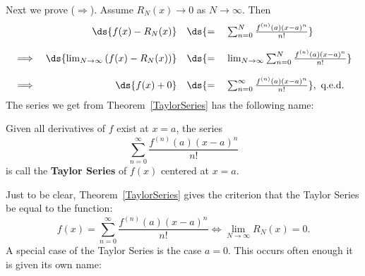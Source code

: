 Next we prove ($\Longrightarrow$).
Assume $R_N(x)\longrightarrow0$ as $N\to\infty$.
Then
$$\begin{array}{rrl}
&\ds{f(x)-R_N(x)}&\ds{=\quad\sum_{n=0}^N\frac{f^{(n)}(a)(x-a)^n}{n!}}\\
\\ \implies&\ds{\lim_{N\to\infty}\left(f(x)-R_N(x)\right)}&
	\ds{=\quad\lim_{N\to\infty}\sum_{n=0}^N\frac{f^{(n)}(a)(x-a)^n}{n!}}\\
\\ \implies&\ds{f(x)+0}&
	\ds{=\quad\sum_{n=0}^\infty\frac{f^{(n)}(a)(x-a)^n}{n!}},
\text{ q.e.d.}\end{array}  
$$
The series we get from Theorem~\ref{TaylorSeries} has the following
name:
\begin{definition}Given all derivatives of $f$ exist at $x=a$,
the series
\begin{equation} \sum_{n=0}^\infty\frac{f^{(n)}(a)(x-a)^n}{n!}
\label{TaylorSeriesDefined}\end{equation}
is call the {\bf Taylor Series} of $f(x)$ centered at
$x=a$.\end{definition}
Just to be clear, Theorem~\ref{TaylorSeries} gives the criterion
that the Taylor Series be equal to the function: 
\begin{equation}
f(x)=\sum_{n=0}^\infty\frac{f^{(n)}(a)(x-a)^n}{n!}
\iff \lim_{N\to\infty}R_N(x)=0.\label{Taylor<>Remainder}
\end{equation} 
A special case of the Taylor Series is the case $a=0$. 
This occurs often enough it is given its own name:
